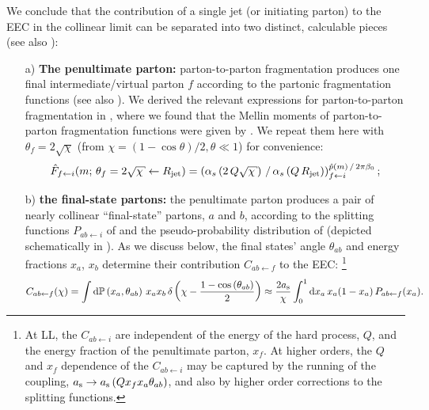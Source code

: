 We conclude that the contribution of a single jet (or initiating parton) to the EEC in the collinear limit can be separated into two distinct, calculable pieces (see also ):
\begin{enumerate}
    \item[a)]
    \textbf{The penultimate parton:}
    parton-to-parton fragmentation produces one final intermediate/virtual parton \(f\) according to the partonic fragmentation functions 
    (see also ).
    We derived the relevant expressions for parton-to-parton fragmentation in , where we found that the Mellin moments of parton-to-parton fragmentation functions were given by .
    We repeat them here with \(\theta_f = 2\sqrt{\chi}\) (from \(\chi = (1-\cos\theta)/2, \theta\ll1\)) for convenience:
    \begin{align*}
        \hat{F}_{f \leftarrow i} (m;\,
        \theta_f = 2 \sqrt{\chi}\leftarrow \Rjet)
        =
        \le(
            \alpha_s\le(2\,Q\sqrt{\chi}\ri)
            \, / \,
            \alpha_s\le(Q\,\Rjet\ri)
        \ri)
        ^
        {\hat{p}(m) \, / \, 2\pi\beta_0}
        _{f\leftarrow i}
        ;
    \end{align*}

    \item[b)]
    \textbf{the final-state partons:}
    the penultimate parton produces a pair of nearly collinear ``final-state'' partons, \(a\) and \(b\), according to the splitting functions \(P_{ab \leftarrow i}\) of  and the pseudo-probability distribution of 
    (depicted schematically in ).
    As we discuss below, the final states' angle \(\theta_{ab}\) and energy fractions \(x_a\), \(x_b\) determine their contribution \(C_{ab\leftarrow f}\) to the EEC:%
    \footnote{
        At LL, the \(C_{ab \leftarrow i}\) are independent of the energy of the hard process, \(Q\), and the energy fraction of the penultimate parton, \(x_f\).
        At higher orders, the \(Q\) and \(x_f\) dependence of the \(C_{ab \leftarrow i}\) may be captured by the running of the coupling, \(a_{\mathrm{s}} \to a_{\mathrm{s}}\left(Q x_f x_a \theta_{ab}\right)\), and also by higher order corrections to the splitting functions.
    }
    \begin{align}
        \label{eq:splitting_fn_contribution_to_eec}
        C_{ab\leftarrow f}(\chi)
        =
        \int \dd\mathbb{P}\le(x_a, \theta_{ab}\ri) \,
            x_a x_b
            \,
            \delta\le(\chi - \frac{1 - \cos\le(\theta_{ab}\ri)}{2}\ri)
        \approx
        \frac{2 \as}{\chi}
        \int_0^1 \dd x_a \, x_a (1-x_a) \,
        P_{ab \leftarrow f}(x_a)
        .
    \end{align}
\end{enumerate}

